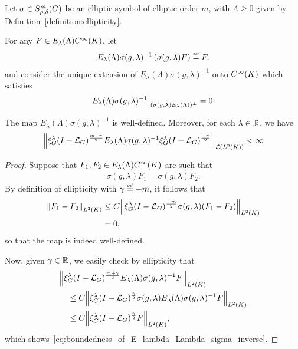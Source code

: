 \begin{lemma}
\label{lemma:inverse_of_elliptic_symbol}
    Let $\sigma \in \SymbolClass m {\rho, \delta}$ be an elliptic symbol of elliptic order $m$,
    with $\Lambda \geq 0$ given by Definition~\ref{definition:ellipticity}.

    For any $F \in E_\lambda(\Lambda) \SmoothFunctions \CompactGroup$,
    let
    \begin{align*}
        E_\lambda(\Lambda) \sigma(g, \lambda)^{-1} \left(\sigma(g, \lambda) F\right) \defeq F.
    \end{align*}
    and consider the unique extension of $E_\lambda(\Lambda) \sigma(g, \lambda)^{-1}$ onto $\SmoothFunctions \CompactGroup$ which satisfies
    \begin{align*}
        \eval {%
            E_\lambda(\Lambda) \sigma(g, \lambda)^{-1}
            } {(\sigma(g, \lambda) E_\lambda(\Lambda))^\perp} = 0.
    \end{align*}

    The map $E_\lambda(\Lambda) \sigma(g, \lambda)^{-1}$ is well-defined.
    Moreover,
    for each $\lambda \in \R$,
    we have
    \begin{align}
        \norm [\Lin {\Lebesgue 2 \CompactGroup}] {%
            \Rep \lambda \BesselPotential {m + \gamma}
            E_\lambda(\Lambda) \sigma(g, \lambda)^{-1}
            \Rep \lambda \BesselPotential {-\gamma}
        }
        < \infty
        \label{eq:boundedness_of_E_lambda_Lambda_sigma_inverse}
    \end{align}
\end{lemma}
\begin{proof}
    Suppose that $F_1, F_2 \in E_\lambda(\Lambda) \SmoothFunctions \CompactGroup$ are such that
    \begin{align*}
        \sigma(g, \lambda) F_1
        = \sigma(g, \lambda) F_2.
    \end{align*}
    By definition of ellipticity with $\gamma \defeq - m$,
    it follows that
    \begin{align*}
        \norm [\Lebesgue 2 \CompactGroup] {F_1 - F_2}
        &\leq C
        \norm [\Lebesgue 2 \CompactGroup] {\Rep \lambda \BesselPotential {-m} \sigma(g, \lambda) (F_1 - F_2)}\\
        &= 0,
    \end{align*}
    so that the map is indeed well-defined.

    Now, given $\gamma \in \R$,
    we easily check by ellipticity that
    \begin{align*}
        &\norm [\Lebesgue 2 \CompactGroup] {\Rep \lambda \BesselPotential {m + \gamma} E_\lambda(\Lambda) \sigma(g, \lambda)^{-1} F}\\
        &\quad \leq C
        \norm [\Lebesgue 2 \CompactGroup] {\Rep \lambda \BesselPotential {\gamma} \sigma(g, \lambda) E_\lambda(\Lambda) \sigma(g, \lambda)^{-1} F}\\
        &\quad \leq C
        \norm [\Lebesgue 2 \CompactGroup] {\Rep \lambda \BesselPotential {\gamma} F},
    \end{align*}
    which shows~\eqref{eq:boundedness_of_E_lambda_Lambda_sigma_inverse}.
\end{proof}

